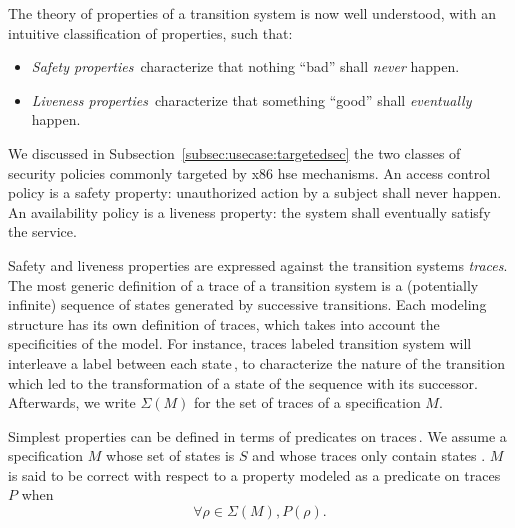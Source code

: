 The theory of properties of a transition system is now well understood, with an
intuitive classification of properties, such that:
%
\begin{itemize}
\item \emph{Safety properties}\,\cite{lamport1977proving,lamport1985logical}
  characterize that nothing ``bad'' shall \emph{never} happen.
\item \emph{Liveness properties}\,\cite{lamport1985logical,alpern1985liveness}
  characterize that something ``good'' shall \emph{eventually} happen.
\end{itemize}

We discussed in Subsection~\ref{subsec:usecase:targetedsec} the two classes of
security policies commonly targeted by x86 \ac{hse} mechanisms.
%
An access control policy is a safety property: unauthorized action by a subject
shall never happen.
%
An availability policy is a liveness property: the system shall eventually
satisfy the service.

Safety and liveness properties are expressed against the transition systems
\emph{traces}.
%
The most generic definition of a trace of a transition system is a (potentially
infinite) sequence of states generated by successive transitions.
%
Each modeling structure has its own definition of traces, which takes into
account the specificities of the model. 
%
For instance, traces labeled transition system  will interleave a label between
each state\,\cite{vijayaraghavan2015modular}, to characterize the nature of the
transition which led to the transformation of a state of the sequence with its
successor. 
%
Afterwards, we write \( \Sigma(M) \) for the set of traces of a specification
\( M \).

Simplest properties can be defined in terms of predicates on
traces\,\cite{alpern1987recognizing,schneider2000enforceable,basin2013enforceable}.
%
We assume a specification \( M \) whose set of states is \( S \) and whose
traces only contain states .
%
\( M \) is said to be correct with respect to a property modeled as a predicate
on traces \( P \) when
%
\[
  \forall \rho \in \Sigma(M), P(\rho).
\]

